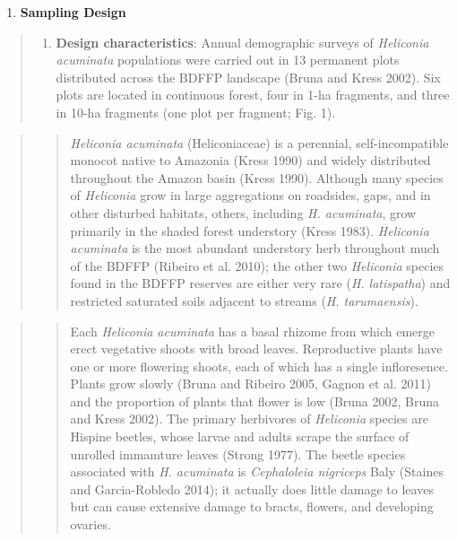 \documentclass[
  12pt,
  man, donotrepeattitle,floatsintext]{apa6}
\providecommand{\tightlist}{%
  \setlength{\itemsep}{0pt}\setlength{\parskip}{0pt}}
\begin{document}
\begin{enumerate}
\def\labelenumi{\arabic{enumi}.}
\setcounter{enumi}{1}
\tightlist
\item
  \textbf{Sampling Design}
\end{enumerate}

\begin{quote}
\begin{enumerate}
\def\labelenumi{\alph{enumi}.}
\tightlist
\item
  \textbf{Design characteristics}: Annual demographic surveys of \emph{Heliconia acuminata} populations were carried out in 13 permanent plots distributed across the BDFFP landscape (Bruna and Kress 2002). Six plots are located in continuous forest, four in 1-ha fragments, and three in 10-ha fragments (one plot per fragment; Fig. 1).
\end{enumerate}
\end{quote}

\begin{quote}
\begin{quote}
\emph{Heliconia acuminata} (Heliconiaceae) is a perennial, self-incompatible monocot native to Amazonia (Kress 1990) and widely distributed throughout the Amazon basin (Kress 1990). Although many species of \emph{Heliconia} grow in large aggregations on roadsides, gaps, and in other disturbed habitats, others, including \emph{H. acuminata}, grow primarily in the shaded forest understory (Kress 1983). \emph{Heliconia acuminata} is the most abundant understory herb throughout much of the BDFFP (Ribeiro et al. 2010); the other two \emph{Heliconia} species found in the BDFFP reserves are either very rare (\emph{H. latispatha}) and restricted saturated soils adjacent to streams (\emph{H. tarumaensis}).
\end{quote}
\end{quote}

\begin{quote}
\begin{quote}
Each \emph{Heliconia acuminata} has a basal rhizome from which emerge erect vegetative shoots with broad leaves. Reproductive plants have one or more flowering shoots, each of which has a single infloresence. Plants grow slowly (Bruna and Ribeiro 2005, Gagnon et al. 2011) and the proportion of plants that flower is low (Bruna 2002, Bruna and Kress 2002). The primary herbivores of \emph{Heliconia} species are Hispine beetles, whose larvae and adults scrape the surface of unrolled immamture leaves (Strong 1977). The beetle species associated with \emph{H. acuminata} is \emph{Cephaloleia nigriceps} Baly (Staines and Garcia-Robledo 2014); it actually does little damage to leaves but can cause extensive damage to bracts, flowers, and developing ovaries.
\end{quote}
\end{quote}
\end{document}
